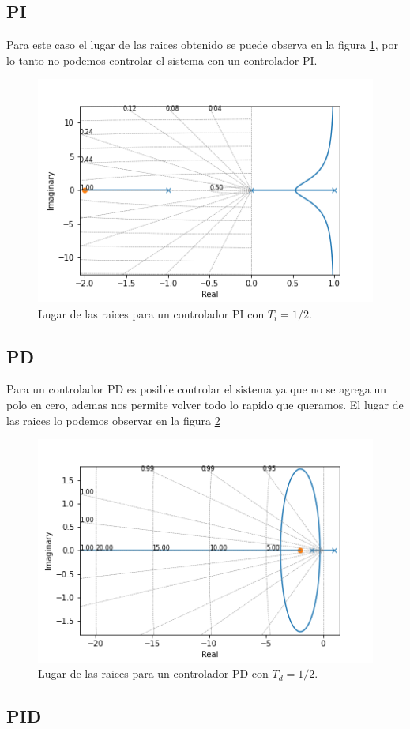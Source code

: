 \documentclass{article}
\begin{document}
        \subsection{PI}

        Para este caso el lugar de las raices obtenido se puede observa en la figura \ref{fig:2-PI}, por lo tanto no 
        podemos controlar el sistema con un controlador PI.

        \begin{figure}[!htb]
            \centering
            \includegraphics[width=.5\textwidth]{Img/2-PI.png}
            \caption{Lugar de las raices para un controlador PI con $T_i=1/2$.}
            \label{fig:2-PI}
        \end{figure}

        \subsection{PD}

        Para un controlador PD es posible controlar el sistema ya que no se agrega un polo en cero, ademas nos permite 
        volver todo lo rapido que queramos. El lugar de las raices lo podemos observar en la figura \ref{fig:2-PD}

        \begin{figure}[!htb]
            \centering
            \includegraphics[width=.5\textwidth]{Img/2-PD.png}
            \caption{Lugar de las raices para un controlador PD con $T_d=1/2$.}
            \label{fig:2-PD}
        \end{figure}

        \subsection{PID}
\end{document}

